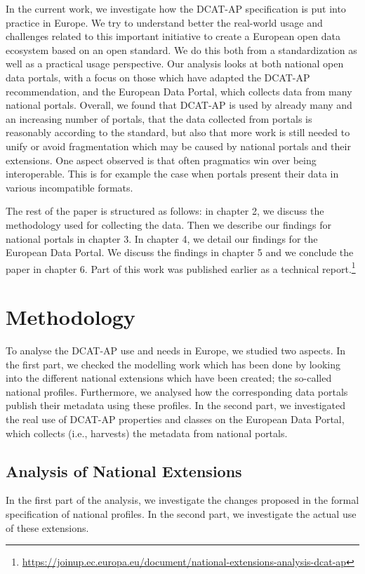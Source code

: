 \documentclass[<options>]{elsarticle}
\begin{document}
In the current work, we investigate how the DCAT-AP specification is put into practice in Europe. We try to understand better the real-world usage and challenges related to this important initiative to create a European open data ecosystem based on an open standard. We do this both from a standardization as well as a practical usage perspective. Our analysis looks at both national open data portals, with a focus on those which have adapted the DCAT-AP recommendation, and the European Data Portal, which collects data from many national portals. Overall, we found that DCAT-AP is used by already many and an increasing number of portals, that the data collected from portals is reasonably according to the standard, but also that more work is still needed to unify or avoid fragmentation which may be caused by national portals and their extensions. One aspect observed is that often pragmatics win over being interoperable. This is for example the case when portals present their data in various incompatible formats.

The rest of the paper is structured as follows: in chapter 2, we discuss the methodology used for collecting the data. Then we describe our findings for national portals in chapter 3. In chapter 4, we detail our findings for the European Data Portal.  We discuss the findings in chapter 5 and we conclude the paper in chapter 6. Part of this work was published earlier as a technical report.\footnote{\href{https://joinup.ec.europa.eu/document/national-extensions-analysis-dcat-ap}{https://joinup.ec.europa.eu/document/national-extensions-analysis-dcat-ap}}


\section{Methodology}
To analyse the DCAT-AP use and needs in Europe, we studied two aspects. In the first part, we checked the modelling work which has been done by looking into the different national extensions which have been created; the so-called national profiles. Furthermore, we analysed how the corresponding data portals publish their metadata using these profiles. In the second part, we investigated the real use of DCAT-AP properties and classes on the European Data Portal, which collects (i.e., harvests) the metadata from national portals.

\subsection{Analysis of National Extensions}
In the first part of the analysis, we investigate the changes proposed in the formal specification of national profiles. In the second part, we investigate the actual use of these extensions.
\end{document}
